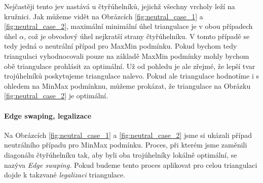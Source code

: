 \documentclass[12pt,a4paper]{article}
\begin{document}
\begin{figure}[h!]
\centering
\begin{floatrow}
\end{floatrow}
\end{figure}


Nejčastěji tento jev nastává u čtyřúhelníků, jejichž všechny vrcholy leží na kružnici. Jak můžeme vidět na Obrázcích \ref{fig:neutral_case_1} a \ref{fig:neutral_case_2}, maximální minimální úhel triangulace je v obou případech úhel $\alpha$, což je obvodový úhel nejkratší strany čtyřúhelníku. V tomto případě se tedy jedná o neutrální případ pro MaxMin podmínku. Pokud bychom tedy triangulaci vyhodnocovali pouze na základě MaxMin podmínky mohly bychom obě triangulace prohlásit za optimální. Už od pohledu je ale zřejmé, že lepší tvar trojúhelníků poskytujeme triangulace nalevo. Pokud ale triangulace hodnotíme i s ohledem na MinMax podmínknu, můžeme prokázat, že triangulace na Obrázku \ref{fig:neutral_case_2} je optimální.


\paragraph{Edge swaping, legalizace}
Na Obrázcích \ref{fig:neutral_case_1} a \ref{fig:neutral_case_2} jsme si ukázali případ neutrálního případu pro MinMax podmínku. Proces, při kterém jsme zaměnili diagonálu čtyřúhelníku tak, aby byli oba trojúhelníky lokálně optimální, se nazýva \emph{Edge swaping.} Pokud budeme tento proces aplikovat pro celou triangulaci dojde k takzvané \emph{legalizaci} triangulace.
\end{document}
